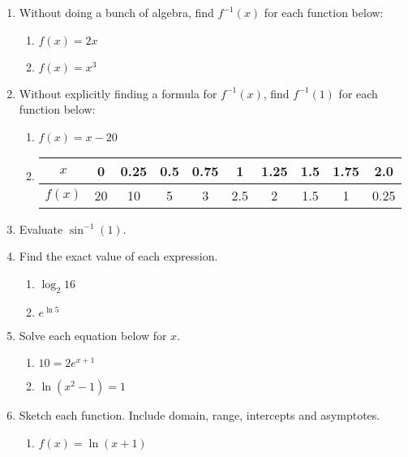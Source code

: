 \documentclass[11pt,fleqn]{article}
\begin{document}
\renewcommand{\headrulewidth}{0pt}
\newcommand{\blank}[1]{\rule{#1}{0.75pt}}
\renewcommand{\d}{\displaystyle}


\vspace*{-0.7in}
\begin{center}
  \LARGE {}
\end{center}
\begin{enumerate}
\item Without doing a bunch of algebra, find $f^{-1}(x)$ for each function below:
\begin{multicols}{2}
\begin{enumerate}
	\item $f(x)=2x$
	\item $f(x)= x^3$
	\end{enumerate}
	\end{multicols}
	\vfill
\item Without explicitly finding a formula for $f^{-1}(x)$, find $f^{-1}(1)$ for each function below:\\
\begin{multicols}{3}
\begin{enumerate}
	\item $f(x)=x-20$
	\item \begin{tabular}{|c||c|c|c|c|c|c|c|c|c|}
$x$&0&0.25&0.5&0.75&1&1.25&1.5&1.75&2.0\\
\hline
$f(x)$&20&10&5&3&2.5&2&1.5&1&0.25\\
\end{tabular}

	\end{enumerate}
	\end{multicols}
	\vfill
\item Evaluate $\sin^{-1}(1).$
\vfill
\item Find the exact value of each expression.
\begin{multicols}{2}
\begin{enumerate}
	\item $\log_2 16$
	\item $e^{\ln 5}$
	\end{enumerate}
	\end{multicols}
	\vfill

\newpage
\item Solve each equation below for $x$.
\begin{multicols}{2}
\begin{enumerate}
	\item $10=2e^{x+1}$
	\item $\ln (x^2-1)=1$
	\end{enumerate}
	\end{multicols}
	\vfill
\item Sketch each function. Include domain, range, intercepts and asymptotes.\\
\begin{multicols}{2}
\begin{enumerate}
	\item $f(x)=\ln(x+1)$
	

\end{enumerate}
\end{multicols}
\end{enumerate}
\end{document}
